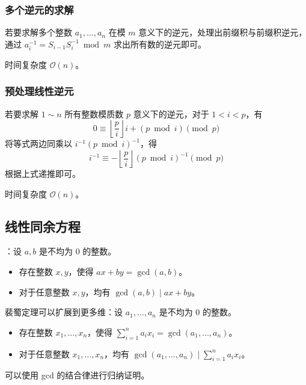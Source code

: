 \subsubsection{多个逆元的求解}

若要求解多个整数 $a_1, \dots, a_n$ 在模 $m$ 意义下的逆元，处理出前缀积与前缀积逆元，通过 $a^{-1}_i = S_{i - 1}S^{-1}_i \bmod m$ 求出所有数的逆元即可。

时间复杂度 $\mathcal{O}(n)$。

\subsubsection{预处理线性逆元}

若要求解 $1 \sim n$ 所有整数模质数 $p$ 意义下的逆元，对于 $1 < i < p$，有
\[
0 \equiv \left\lfloor \frac{p}{i} \right\rfloor i + (p \bmod i) \pmod p
\]
将等式两边同乘以 $i^{-1}(p \bmod i)^{-1}$，得
\[
i^{-1} \equiv -\left\lfloor \frac{p}{i} \right\rfloor (p \bmod i)^{-1} \pmod p
\]
根据上式递推即可。

时间复杂度 $\mathcal{O}(n)$。


\subsection{线性同余方程}

：设 $a, b$ 是不均为 $0$ 的整数。

\begin{itemize}
    \item 存在整数 $x, y$，使得 $ax + by = \gcd(a, b)$。
    \item 对于任意整数 $x, y$，均有 $\gcd(a, b) \mid ax + by$。
\end{itemize}

\begin{quoteblock}
裴蜀定理可以扩展到更多维：设 $a_1, \dots, a_n$ 是不均为 $0$ 的整数。

\begin{itemize}
    \item 存在整数 $x_1, \dots, x_n$，使得 $\sum_{i = 1}^n a_ix_i = \gcd(a_1, \dots, a_n)$。
    \item 对于任意整数 $x_1, \dots, x_n$，均有 $\gcd(a_1, \dots, a_n) \mid \sum_{i = 1}^n a_ix_i$。
\end{itemize}

可以使用 gcd 的结合律进行归纳证明。
\end{quoteblock}

